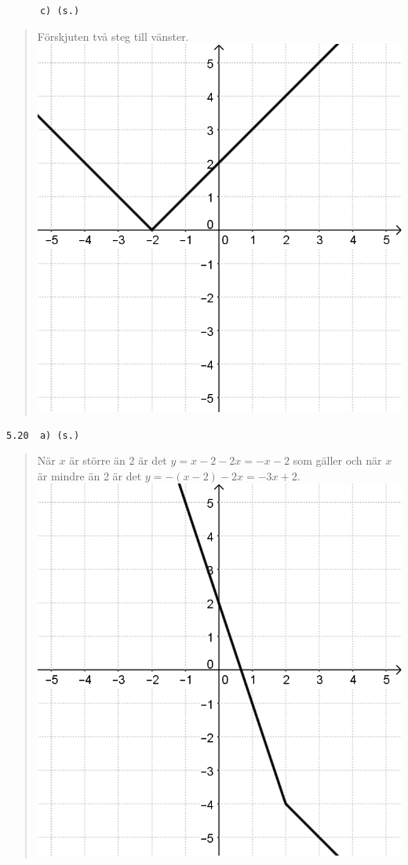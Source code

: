 \documentclass[a4paper]{article}
\newcommand{\tskcol}[1]{\textcolor{tskcol}{#1}}
\begin{document}
	\texttt{\tskcol{~~~~~~c) (s.)}}
	\begin{quotation}
		\noindent
		Förskjuten två steg till vänster. \\
		\includegraphics[scale=0.2]{images/519c.png}
	\end{quotation}
	
	\texttt{\tskcol{5.20~~a) (s.)}}
	\begin{quotation}
		\noindent
		När $x$ är större än 2 är det $y=x-2-2x=-x-2$ som gäller och när $x$ är mindre än 2 är det $y=-(x-2)-2x=-3x+2$. \\
		\includegraphics[scale=0.2]{images/520a.png}
	\end{quotation}
	
\end{document}
